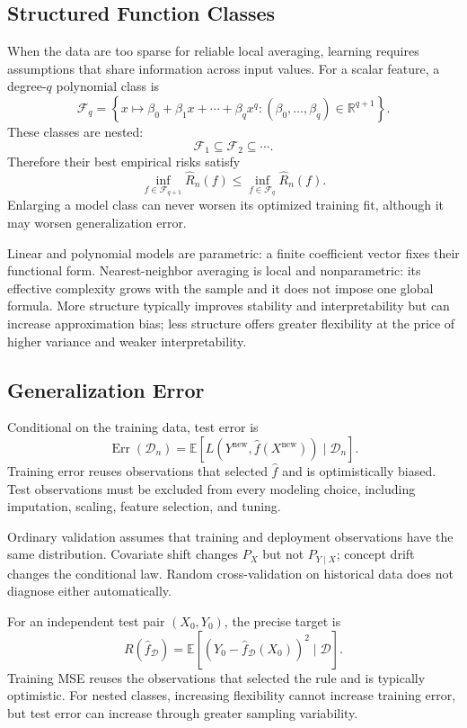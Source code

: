 \documentclass[12pt,oneside]{book}
\numberwithin{equation}{section}
\theoremstyle{definition}
\theoremstyle{plain}
\theoremstyle{remark}
\newcommand{\R}{\mathbb{R}}
\newcommand{\E}{\mathbb{E}}
\begin{document}
\subsection{Structured Function Classes}
When the data are too sparse for reliable local averaging, learning requires
assumptions that share information across input values. For a scalar feature,
a degree-$q$ polynomial class is
\[
 \mathcal F_q
 =\left\{x\mapsto\beta_0+\beta_1x+\cdots+\beta_qx^q:
 (\beta_0,\ldots,\beta_q)\in\R^{q+1}\right\}.
\]
These classes are nested:
\[
 \mathcal F_1\subseteq\mathcal F_2\subseteq\cdots.
\]
Therefore their best empirical risks satisfy
\[
 \inf_{f\in\mathcal F_{q+1}}\widehat R_n(f)
 \leq
 \inf_{f\in\mathcal F_q}\widehat R_n(f).
\]
Enlarging a model class can never worsen its optimized training fit, although
it may worsen generalization error.

Linear and polynomial models are parametric: a finite coefficient vector fixes
their functional form. Nearest-neighbor averaging is local and nonparametric:
its effective complexity grows with the sample and it does not impose one
global formula. More structure typically improves stability and
interpretability but can increase approximation bias; less structure offers
greater flexibility at the price of higher variance and weaker
interpretability.

\subsection{Generalization Error}

Conditional on the training data, test error is
\[
 \operatorname{Err}(\mathcal D_n)
 =\E[L(Y^{\mathrm{new}},\widehat f(X^{\mathrm{new}}))\mid\mathcal D_n].
\]
Training error reuses observations that selected $\widehat f$ and is
optimistically biased. Test observations must be excluded from every modeling
choice, including imputation, scaling, feature selection, and tuning.

Ordinary validation assumes that training and deployment observations have
the same distribution. Covariate shift changes $P_X$ but not $P_{Y\mid X}$;
concept drift changes the conditional law. Random cross-validation on
historical data does not diagnose either automatically.

For an independent test pair $(X_0,Y_0)$, the precise target is
\begin{equation}
 R(\widehat f_{\mathcal D})
 =\E[(Y_0-\widehat f_{\mathcal D}(X_0))^2\mid\mathcal D].
 \label{eq:fitted-generalization-risk}
\end{equation}
Training MSE reuses the observations that selected the rule and is typically
optimistic. For nested classes, increasing flexibility cannot increase
training error, but test error can increase through greater sampling
variability.
\end{document}
